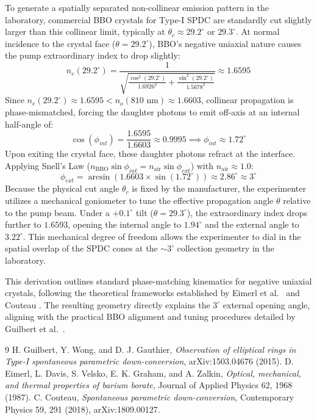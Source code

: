 \documentclass[12pt,a4paper]{article}
\begin{document}
To generate a spatially separated non-collinear emission pattern in the laboratory, commercial BBO crystals for Type-I SPDC are standardly cut slightly larger than this collinear limit, typically at $\theta_c \approx 29.2^\circ$ or $29.3^\circ$. At normal incidence to the crystal face ($\theta = 29.2^\circ$), BBO's negative uniaxial nature causes the pump extraordinary index to drop slightly:
\begin{equation}
    n_e(29.2^\circ) = \frac{1}{\sqrt{\frac{\cos^2(29.2^\circ)}{1.6926^2} + \frac{\sin^2(29.2^\circ)}{1.5678^2}}} \approx 1.6595
\end{equation}
Since $n_e(29.2^\circ) \approx 1.6595 < n_o(810\text{ nm}) \approx 1.6603$, collinear propagation is phase-mismatched, forcing the daughter photons to emit off-axis at an internal half-angle of:
\begin{equation}
    \cos(\phi_{int}) = \frac{1.6595}{1.6603} \approx 0.9995 \implies \phi_{int} \approx 1.72^\circ
\end{equation}
Upon exiting the crystal face, these daughter photons refract at the interface. Applying Snell's Law ($n_{\text{BBO}} \sin\phi_{int} = n_{\text{air}} \sin\phi_{ext}$) with $n_{\text{air}} \approx 1.0$:
\begin{equation}
    \phi_{ext} = \arcsin(1.6603 \times \sin(1.72^\circ)) \approx 2.86^\circ \approx 3^\circ
\end{equation}
Because the physical cut angle $\theta_c$ is fixed by the manufacturer, the experimenter utilizes a mechanical goniometer to tune the effective propagation angle $\theta$ relative to the pump beam. Under a $+0.1^\circ$ tilt ($\theta = 29.3^\circ$), the extraordinary index drops further to $1.6593$, opening the internal angle to $1.94^\circ$ and the external angle to $3.22^\circ$. This mechanical degree of freedom allows the experimenter to dial in the spatial overlap of the SPDC cones at the $\sim 3^\circ$ collection geometry in the laboratory.

This derivation outlines standard phase-matching kinematics for negative uniaxial crystals, following the theoretical frameworks established by Eimerl et al.\ \cite{eimerl} and Couteau \cite{couteau}. The resulting geometry directly explains the $3^\circ$ external opening angle, aligning with the practical BBO alignment and tuning procedures detailed by Guilbert et al.\ \cite{guilbert}.

\begin{thebibliography}{9}
H. Guilbert, Y. Wong, and D. J. Gauthier, \textit{Observation of elliptical rings in Type-I spontaneous parametric down-conversion}, arXiv:1503.04676 (2015).
D. Eimerl, L. Davis, S. Velsko, E. K. Graham, and A. Zalkin, \textit{Optical, mechanical, and thermal properties of barium borate}, Journal of Applied Physics 62, 1968 (1987).
C. Couteau, \textit{Spontaneous parametric down-conversion}, Contemporary Physics 59, 291 (2018), arXiv:1809.00127.
\end{thebibliography}
\end{document}
